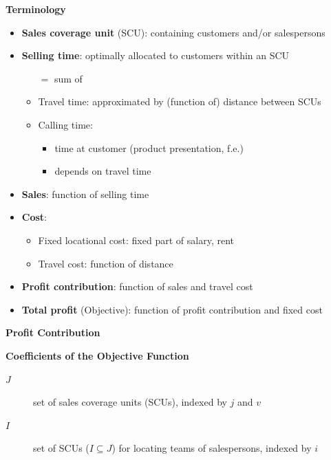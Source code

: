 \documentclass[xcolor=dvipsnames,aspectratio=169, handout, mathserif]{beamer}
\begin{document}
\begin{frame}{\textbf{Terminology}}
\begin{itemize}
	\item \textbf{Sales coverage unit} (SCU): containing customers and/or salespersons
\end{itemize}
	\begin{itemize}[<+->]
	\item \textbf{Selling time}: optimally allocated to customers within an SCU
	\begin{itemize}
	  \item[$=$] sum of 
		\item Travel time: approximated by (function of) distance between SCUs
	  \item Calling time: 
		\begin{itemize}
			\item time at customer (product presentation, f.e.) 
			\item depends on travel time
		\end{itemize}
	\end{itemize}	
	\item \textbf{Sales}: function of selling time
	\item \textbf{Cost}:
	\begin{itemize}
	\item Fixed locational cost: fixed part of salary, rent
	\item Travel cost: function of distance
	\end{itemize}
	\item \textbf{Profit contribution}: function of sales and travel cost
	\item \textbf{Total profit} (Objective): function of profit contribution and fixed cost
\end{itemize}
\end{frame}


\begin{frame}
\begin{center}
{\LARGE \textbf{Profit Contribution}}
\end{center}
\end{frame}

\begin{frame}{\textbf{Coefficients of the Objective Function}}
\begin{description}
	\item[$J$]       set of sales coverage units (SCUs), indexed by $j$ and $v$
  \item[$I$]       set of SCUs ($I \subseteq J$) for locating teams of salespersons, indexed by $i$
\end{description}
\begin{center}

\end{center}

\end{frame}
\end{document}
